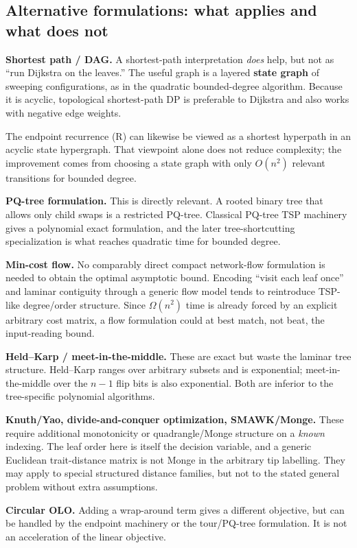 \documentclass[11pt]{article}
\theoremstyle{plain}
\begin{document}
\subsection{Alternative formulations: what applies and what does not}

\textbf{Shortest path / DAG.} A shortest-path interpretation \emph{does} help,
but not as ``run Dijkstra on the leaves.'' The useful graph is a layered
\textbf{state graph} of sweeping configurations, as in the quadratic
bounded-degree algorithm. Because it is acyclic, topological shortest-path DP is
preferable to Dijkstra and also works with negative edge weights.

The endpoint recurrence (R) can likewise be viewed as a shortest hyperpath in
an acyclic state hypergraph. That viewpoint alone does not reduce complexity;
the improvement comes from choosing a state graph with only \(O(n^2)\) relevant
transitions for bounded degree.

\textbf{PQ-tree formulation.} This is directly relevant. A rooted binary tree
that allows only child swaps is a restricted PQ-tree. Classical PQ-tree TSP
machinery gives a polynomial exact formulation, and the later
tree-shortcutting specialization is what reaches quadratic time for bounded
degree.

\textbf{Min-cost flow.} No comparably direct compact network-flow formulation
is needed to obtain the optimal asymptotic bound. Encoding ``visit each leaf
once'' and laminar contiguity through a generic flow model tends to reintroduce
TSP-like degree/order structure. Since \(\Omega(n^2)\) time is already forced
by an explicit arbitrary cost matrix, a flow formulation could at best match,
not beat, the input-reading bound.

\textbf{Held--Karp / meet-in-the-middle.} These are exact but waste the laminar
tree structure. Held--Karp ranges over arbitrary subsets and is exponential;
meet-in-the-middle over the \(n-1\) flip bits is also exponential. Both are
inferior to the tree-specific polynomial algorithms.

\textbf{Knuth/Yao, divide-and-conquer optimization, SMAWK/Monge.} These require
additional monotonicity or quadrangle/Monge structure on a \emph{known}
indexing. The leaf order here is itself the decision variable, and a generic
Euclidean trait-distance matrix is not Monge in the arbitrary tip labelling.
They may apply to special structured distance families, but not to the stated
general problem without extra assumptions.

\textbf{Circular OLO.} Adding a wrap-around term gives a different objective,
but can be handled by the endpoint machinery or the tour/PQ-tree formulation.
It is not an acceleration of the linear objective.
\end{document}

